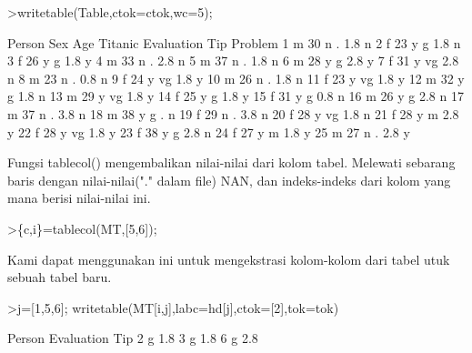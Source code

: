\documentclass[a4paper,10pt]{article}
\begin{document}
\begin{eulernotebook}
\begin{eulerprompt}
>writetable(Table,ctok=ctok,wc=5);
\end{eulerprompt}
\begin{euleroutput}
   Person  Sex  Age Titanic Evaluation  Tip Problem
        1    m   30       n          .  1.8       n
        2    f   23       y          g  1.8       n
        3    f   26       y          g  1.8       y
        4    m   33       n          .  2.8       n
        5    m   37       n          .  1.8       n
        6    m   28       y          g  2.8       y
        7    f   31       y         vg  2.8       n
        8    m   23       n          .  0.8       n
        9    f   24       y         vg  1.8       y
       10    m   26       n          .  1.8       n
       11    f   23       y         vg  1.8       y
       12    m   32       y          g  1.8       n
       13    m   29       y         vg  1.8       y
       14    f   25       y          g  1.8       y
       15    f   31       y          g  0.8       n
       16    m   26       y          g  2.8       n
       17    m   37       n          .  3.8       n
       18    m   38       y          g    .       n
       19    f   29       n          .  3.8       n
       20    f   28       y         vg  1.8       n
       21    f   28       y          m  2.8       y
       22    f   28       y         vg  1.8       y
       23    f   38       y          g  2.8       n
       24    f   27       y          m  1.8       y
       25    m   27       n          .  2.8       y
\end{euleroutput}
\begin{eulercomment}
Fungsi tablecol() mengembalikan nilai-nilai dari kolom tabel. Melewati sebarang baris
dengan nilai-nilai("." dalam file) NAN, dan indeks-indeks dari kolom yang mana berisi
nilai-nilai ini.
\end{eulercomment}
\begin{eulerprompt}
>\{c,i\}=tablecol(MT,[5,6]);
\end{eulerprompt}
\begin{eulercomment}
Kami dapat menggunakan ini untuk mengekstrasi kolom-kolom dari tabel utuk sebuah tabel
baru.
\end{eulercomment}
\begin{eulerprompt}
>j=[1,5,6]; writetable(MT[i,j],labc=hd[j],ctok=[2],tok=tok)
\end{eulerprompt}
\begin{euleroutput}
      Person Evaluation       Tip
           2          g       1.8
           3          g       1.8
           6          g       2.8

\end{euleroutput}
\end{eulernotebook}
\end{document}
